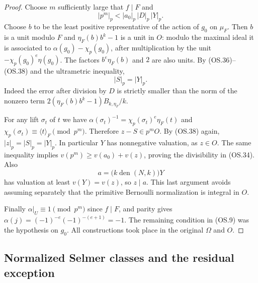 \begin{proof}
Choose $m$ sufficiently large that $f\mid F$ and
\[
                  |p^m|_p<|a_0|_p\,|D|_p\,|Y|_p.
 \tag{OS.38}
\]
Choose $b$ to be the least positive representative of the action of
$g_0$ on $\mu_F$.  Then $b$ is a unit modulo $F$ and
$\eta_F(b)b^k-1$ is a unit in $O$:
modulo the maximal ideal it is associated to
$\alpha(g_0)-\chi_p(g_0)$, after multiplication by the unit
$-\chi_p(g_0)^e\eta(g_0)$.
The factors $b^e\eta_F(b)$ and $2$ are also units.
By (OS.36)--(OS.38) and the ultrametric inequality,
\[
                             |S|_p=|Y|_p.
\]
Indeed the error after division by $D$ is strictly smaller than
the norm of the nonzero term
$2(\eta_F(b)b^k-1)B_{k,\eta_F}/k$.

For any lift $\sigma_t$ of $t$ we have
$\alpha(\sigma_t)^{-1}=\chi_p(\sigma_t)^e\eta_F(t)$ and
$\chi_p(\sigma_t)\equiv\langle t\rangle_F\pmod{p^m}$.
Therefore $z-S\in p^mO$.
By (OS.38) again, $|z|_p=|S|_p=|Y|_p$.
In particular $Y$ has nonnegative valuation, as $z\in O$.
The same inequality implies $v(p^m)\ge v(a_0)+v(z)$, proving
the divisibility in (OS.34).
Also
\[
        a=\bigl(k\operatorname{den}(N,k)\bigr)Y
\]
has valuation at least $v(Y)=v(z)$, so $z\mid a$.
This last argument avoids assuming separately that the primitive
Bernoulli normalization is integral in $O$.

Finally $\alpha|_U\equiv1\pmod{p^m}$ since $f\mid F$,
and parity gives
$\alpha(j)=(-1)^{-e}(-1)^{-(e+1)}=-1$.
The remaining condition in (OS.9) was the hypothesis on $g_0$.
All constructions took place in the original $\Omega$ and $O$.
\end{proof}

\subsection{Normalized Selmer classes and the residual exception}

